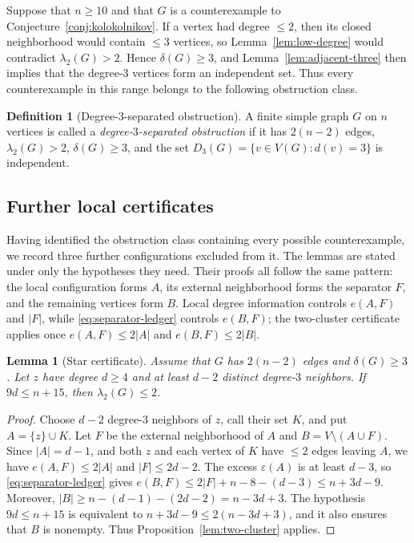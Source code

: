 \documentclass[11pt]{article}
\numberwithin{equation}{section}
\newtheorem{lemma}[theorem]{Lemma}
\theoremstyle{definition}
\newtheorem{definition}[theorem]{Definition}
\theoremstyle{remark}
\newcommand{\ac}{\lambda_2}
\begin{document}
Suppose that \(n\ge10\) and that \(G\) is a counterexample to
Conjecture~\ref{conj:kolokolnikov}.  If a vertex had degree \(\le2\),
then its closed neighborhood would contain \(\le3\) vertices, so
Lemma~\ref{lem:low-degree} would contradict \(\ac(G)>2\).  Hence
\(\delta(G)\ge3\), and Lemma~\ref{lem:adjacent-three} then implies that
the degree-\(3\) vertices form an independent set.  Thus every
counterexample in this range belongs to the following obstruction class.

\begin{definition}[Degree-\(3\)-separated obstruction]
\label{def:separated-obstruction}
A finite simple graph \(G\) on \(n\) vertices is called a
\emph{degree-\(3\)-separated obstruction} if it has \(2(n-2)\) edges,
\(\ac(G)>2\), \(\delta(G)\ge3\), and the set
\(D_3(G)=\{v\in V(G):d(v)=3\}\) is independent.
\end{definition}

\subsection{Further local certificates}

Having identified the obstruction class containing every possible
counterexample, we record three further configurations excluded from it.
The lemmas are stated under only the hypotheses they need.  Their proofs all
follow the same pattern: the local configuration forms \(A\), its external
neighborhood forms the separator \(F\), and the remaining vertices form
\(B\).  Local degree information controls \(e(A,F)\) and \(|F|\), while
\eqref{eq:separator-ledger} controls \(e(B,F)\); the two-cluster certificate
applies once \(e(A,F)\le2|A|\) and \(e(B,F)\le2|B|\).

\begin{lemma}[Star certificate]\label{lem:star}
Assume that \(G\) has \(2(n-2)\) edges and \(\delta(G)\ge3\).  Let \(z\)
have degree \(d\ge4\) and at least \(d-2\) distinct degree-\(3\)
  neighbors.  If
\(9d\le n+15\),
then \(\ac(G)\le2\).
\end{lemma}

\begin{proof}
Choose \(d-2\) degree-\(3\) neighbors of \(z\), call their set \(K\), and
put \(A=\{z\}\cup K\).  Let \(F\) be the external neighborhood of \(A\)
and \(B=V\setminus(A\cup F)\).  Since \(|A|=d-1\), and both \(z\) and each
vertex of \(K\) have \(\le2\) edges leaving \(A\), we have
\(e(A,F)\le2|A|\) and \(|F|\le2d-2\).
The excess \(\varepsilon(A)\) is at least \(d-3\), so
\eqref{eq:separator-ledger} gives
\(e(B,F)\le2|F|+n-8-(d-3)\le n+3d-9\).  Moreover,
\(|B|\ge n-(d-1)-(2d-2)=n-3d+3\).  The hypothesis \(9d\le n+15\) is
equivalent to
\(n+3d-9\le2(n-3d+3)\), and it also ensures that \(B\) is nonempty.
Thus Proposition~\ref{lem:two-cluster} applies.
\end{proof}
\end{document}
